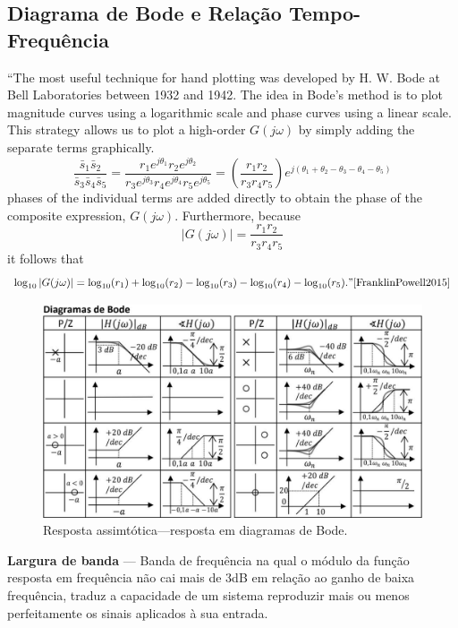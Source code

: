\subsection[4.1 Diagrama de Bode e Relação Tempo-Frequência]{\hspace*{0.075 em}\raisebox{0.2 em}{$\pmb{\drsh}$} Diagrama de Bode e Relação Tempo-Frequência}
``The most useful technique for hand plotting was developed by H. W. Bode at Bell Laboratories between 1932 and 1942. The idea in Bode's method is to plot magnitude curves using a logarithmic scale and phase curves using a linear scale. This strategy allows us to plot a high-order $G(j\omega)$ by simply adding the separate terms graphically.
$$
    \frac{\bar{s}_1 \bar{s}_2}{\bar{s}_3 \bar{s}_4 \bar{s}_5} = \frac{r_1 e^{j\theta_1} r_2 e^{j\theta_2}}{r_3 e^{j\theta_3} r_4 e^{j\theta_4} r_5 e^{j\theta_5}} =
    \left( \frac{r_1 r_2}{r_3 r_4 r_5} \right) e^{j(\theta_1 + \theta_2 - \theta_3 - \theta_4 - \theta_5)}
$$
phases of the individual terms are added directly to obtain the phase of the composite expression, $G(j\omega)$. Furthermore, because
$$
    \vert G(j\omega) \vert = \frac{r_1 r_2}{r_3 r_4 r_5}
$$
it follows that
$$
    \log_{10}\vert G(j\omega) \vert = \log_{10}(r_1) + \log_{10}(r_2) - \log_{10}(r_3) - \log_{10}(r_4) - \log_{10}(r_5).\text{''\cite{FranklinPowell2015}}
$$

\begin{figure}[H]
    \centering
    \includegraphics[width = 0.7\linewidth]{img/3/bode.png}
    \caption{Resposta assimtótica---resposta em diagramas de Bode.}
    \label{fig:bode}
\end{figure}

\noindent\textbf{Largura de banda} --- Banda de frequência na qual o módulo da função resposta em frequência não cai mais de 3dB em relação ao ganho de baixa frequência, traduz a capacidade de um sistema reproduzir mais ou menos perfeitamente os sinais aplicados à sua entrada.
